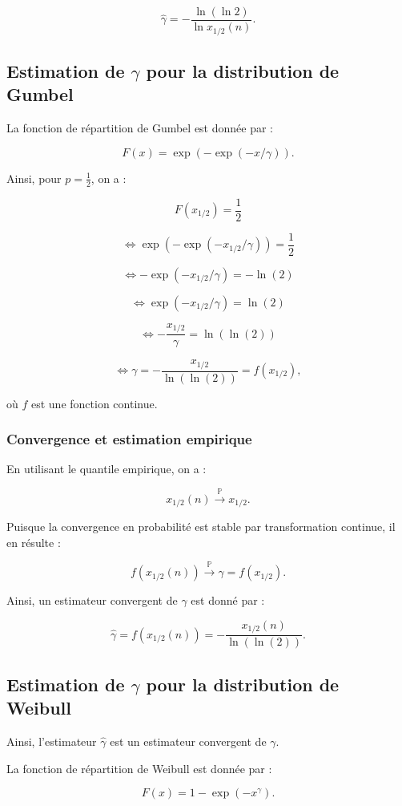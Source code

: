 \documentclass{article}
\begin{document}
\[
\hat{\gamma} = -\frac{\ln (\ln 2)}{\ln x_{1/2}(n)}.
\]
\subsection{Estimation de \(\gamma\) pour la distribution de Gumbel}

La fonction de répartition de Gumbel est donnée par :

\[
F(x) = \exp(-\exp(-x/\gamma)).
\]

Ainsi, pour \(p = \frac{1}{2}\), on a :

\[
F(x_{1/2}) = \frac{1}{2}
\]

\[
\iff \exp(-\exp(-x_{1/2}/\gamma)) = \frac{1}{2}
\]

\[
\iff -\exp(-x_{1/2}/\gamma) = -\ln(2)
\]

\[
\iff \exp(-x_{1/2}/\gamma) = \ln(2)
\]

\[
\iff -\frac{x_{1/2}}{\gamma} = \ln(\ln(2))
\]

\[
\iff \gamma = -\frac{x_{1/2}}{\ln(\ln(2))} = f(x_{1/2}),
\]

où \(f\) est une fonction continue.

\subsubsection{Convergence et estimation empirique}

En utilisant le quantile empirique, on a :

\[
x_{1/2}(n) \xrightarrow{\mathbb{P}} x_{1/2}.
\]

Puisque la convergence en probabilité est stable par transformation continue, il en résulte :

\[
f(x_{1/2}(n)) \xrightarrow{\mathbb{P}} \gamma = f(x_{1/2}).
\]

Ainsi, un estimateur convergent de \(\gamma\) est donné par :

\[
\hat{\gamma} = f(x_{1/2}(n)) = -\frac{x_{1/2}(n)}{\ln(\ln(2))}.
\]

\subsection{Estimation de \(\gamma\) pour la distribution de Weibull}

Ainsi, l'estimateur \(\hat{\gamma}\) est un estimateur convergent de \(\gamma\).

La fonction de répartition de Weibull est donnée par :

\[
F(x) = 1 - \exp(-x^{\gamma}).
\]
\end{document}
